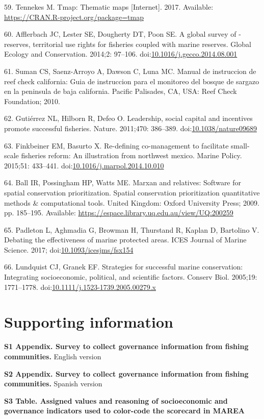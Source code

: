 \documentclass[12pt,]{article}
\begin{document}
\hypertarget{ref-tmap_2017}{}
59. Tennekes M. Tmap: Thematic maps {[}Internet{]}. 2017. Available:
\url{https://CRAN.R-project.org/package=tmap}

\hypertarget{ref-afflerbach_2014-HP}{}
60. Afflerbach JC, Lester SE, Dougherty DT, Poon SE. A global survey of
-reserves, territorial use rights for fisheries coupled with marine
reserves. Global Ecology and Conservation. 2014;2: 97--106.
doi:\href{https://doi.org/10.1016/j.gecco.2014.08.001}{10.1016/j.gecco.2014.08.001}

\hypertarget{ref-suman_2010-ez}{}
61. Suman CS, Saenz-Arroyo A, Dawson C, Luna MC. Manual de instruccion
de reef check california: Guia de instruccion para el monitoreo del
bosque de sargazo en la peninsula de baja california. Pacific Palisades,
CA, USA: Reef Check Foundation; 2010.

\hypertarget{ref-gutirrez_2011-0U}{}
62. Gutiérrez NL, Hilborn R, Defeo O. Leadership, social capital and
incentives promote successful fisheries. Nature. 2011;470: 386--389.
doi:\href{https://doi.org/10.1038/nature09689}{10.1038/nature09689}

\hypertarget{ref-finkbeiner_2015-87}{}
63. Finkbeiner EM, Basurto X. Re-defining co-management to facilitate
small-scale fisheries reform: An illustration from northwest mexico.
Marine Policy. 2015;51: 433--441.
doi:\href{https://doi.org/10.1016/j.marpol.2014.10.010}{10.1016/j.marpol.2014.10.010}

\hypertarget{ref-ball_2009-qi}{}
64. Ball IR, Possingham HP, Watts ME. Marxan and relatives: Software for
spatial conservation prioritization. Spatial conservation prioritization
quantitative methods \& computational tools. United Kingdom: Oxford
University Press; 2009. pp. 185--195. Available:
\url{https://espace.library.uq.edu.au/view/UQ:200259}

\hypertarget{ref-padleton_2017-vn}{}
65. Padleton L, Aghmadia G, Browman H, Thurstand R, Kaplan D, Bartolino
V. Debating the effectiveness of marine protected areas. ICES Journal of
Marine Science. 2017;
doi:\href{https://doi.org/10.1093/icesjms/fsx154}{10.1093/icesjms/fsx154}

\hypertarget{ref-lundquist_2005-OL}{}
66. Lundquist CJ, Granek EF. Strategies for successful marine
conservation: Integrating socioeconomic, political, and scientific
factors. Conserv Biol. 2005;19: 1771--1778.
doi:\href{https://doi.org/10.1111/j.1523-1739.2005.00279.x}{10.1111/j.1523-1739.2005.00279.x}

\section{Supporting information}\label{supporting-information}

\textbf{S1 Appendix. Survey to collect governance information from
fishing communities.} English version

\textbf{S2 Appendix. Survey to collect governance information from
fishing communities.} Spanish version

\textbf{S3 Table. Assigned values and reasoning of socioeconomic and
governance indicators used to color-code the scorecard in MAREA}
\end{document}

